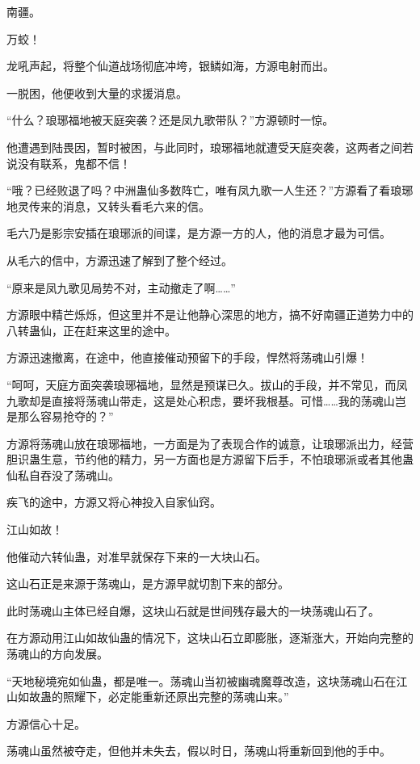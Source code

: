 
\begin{this_body}

南疆。

万蛟！

龙吼声起，将整个仙道战场彻底冲垮，银鳞如海，方源电射而出。

一脱困，他便收到大量的求援消息。

“什么？琅琊福地被天庭突袭？还是凤九歌带队？”方源顿时一惊。

他遭遇到陆畏因，暂时被困，与此同时，琅琊福地就遭受天庭突袭，这两者之间若说没有联系，鬼都不信！

“哦？已经败退了吗？中洲蛊仙多数阵亡，唯有凤九歌一人生还？”方源看了看琅琊地灵传来的消息，又转头看毛六来的信。

毛六乃是影宗安插在琅琊派的间谍，是方源一方的人，他的消息才最为可信。

从毛六的信中，方源迅速了解到了整个经过。

“原来是凤九歌见局势不对，主动撤走了啊……”

方源眼中精芒烁烁，但这里并不是让他静心深思的地方，搞不好南疆正道势力中的八转蛊仙，正在赶来这里的途中。

方源迅速撤离，在途中，他直接催动预留下的手段，悍然将荡魂山引爆！

“呵呵，天庭方面突袭琅琊福地，显然是预谋已久。拔山的手段，并不常见，而凤九歌却是直接将荡魂山带走，这是处心积虑，要坏我根基。可惜……我的荡魂山岂是那么容易抢夺的？”

方源将荡魂山放在琅琊福地，一方面是为了表现合作的诚意，让琅琊派出力，经营胆识蛊生意，节约他的精力，另一方面也是方源留下后手，不怕琅琊派或者其他蛊仙私自吞没了荡魂山。

疾飞的途中，方源又将心神投入自家仙窍。

江山如故！

他催动六转仙蛊，对准早就保存下来的一大块山石。

这山石正是来源于荡魂山，是方源早就切割下来的部分。

此时荡魂山主体已经自爆，这块山石就是世间残存最大的一块荡魂山石了。

在方源动用江山如故仙蛊的情况下，这块山石立即膨胀，逐渐涨大，开始向完整的荡魂山的方向发展。

“天地秘境宛如仙蛊，都是唯一。荡魂山当初被幽魂魔尊改造，这块荡魂山石在江山如故蛊的照耀下，必定能重新还原出完整的荡魂山来。”

方源信心十足。

荡魂山虽然被夺走，但他并未失去，假以时日，荡魂山将重新回到他的手中。


\end{this_body}

